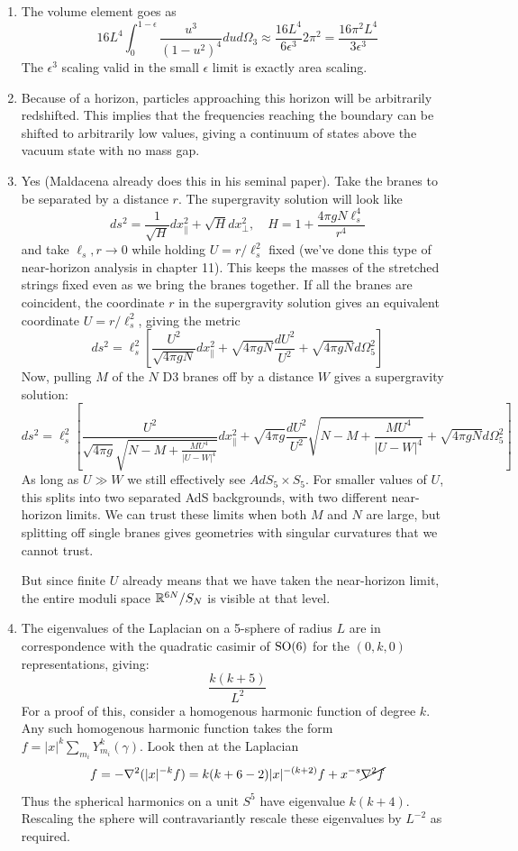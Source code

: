 \documentclass[11pt, class=article, crop=false]{standalone}
\begin{document}
\begin{enumerate}
	\item The volume element goes as
	\[
		16 L^4 \int_0^{1-\epsilon} \frac{u^3}{(1-u^2)^4} du d\Omega_3 \approx \frac{16 L^4}{6 \epsilon^3} 2 \pi^2 = \frac{16 \pi^2 L^4}{3 \epsilon^3}
	\]
	The $\epsilon^3$ scaling valid in the small $\epsilon$ limit is exactly area scaling.
	
	\item Because of a horizon, particles approaching this horizon will be arbitrarily redshifted. This implies that the frequencies reaching the boundary can be shifted to arbitrarily low values, giving a continuum of states above the vacuum state with no mass gap.
	
	\item Yes (Maldacena already does this in his seminal paper). Take the branes to be separated by a distance $r$. The supergravity solution will look like
	\[
		ds^2 = \frac{1}{\sqrt{H}} dx_{\parallel}^2 + \sqrt{H} dx_\perp^2, \quad H = 1 + \frac{4 \pi g N \ell_s^4}{r^4}
	\]
	and take $\ell_s, r \to 0$ while holding $U = r/\ell_s^2$ fixed (we've done this type of near-horizon analysis in chapter 11). This keeps the masses of the stretched strings fixed even as we bring the branes together. If all the branes are coincident, the coordinate $r$ in the supergravity solution gives an equivalent coordinate $U = r/\ell_s^2$, giving the metric
	\[
		ds^2 = \ell_s^2 \left[ \frac{U^2}{\sqrt{4 \pi g N}} dx_\parallel^2 + \sqrt{4 \pi g N} \frac{dU^2}{U^2} + \sqrt{4 \pi g N} d\Omega_5^2 \right]
	\]
	Now, pulling $M$ of the $N$ D3 branes off by a distance $W$ gives a supergravity solution:
	\[
			ds^2 = \ell_s^2 \left[ \frac{U^2}{\sqrt{4 \pi g} \sqrt{N - M + \frac{M U^4}{|U - W|^4}}} dx_\parallel^2 + \sqrt{4 \pi g} \frac{dU^2}{U^2} \sqrt{N - M + \frac{M U^4}{|U - W|^4}} + \sqrt{4 \pi g N} d\Omega_5^2 \right]
	\]
	As long as $U \gg W$ we still effectively see $AdS_5 \times S_5$. For smaller values of $U$, this splits into two separated AdS backgrounds, with two different near-horizon limits. We can trust these limits when both $M$ and $N$ are large, but splitting off single branes gives geometries with singular curvatures that we cannot trust. 
	
	But since finite $U$ already means that we have taken the near-horizon limit, the entire moduli space $\mathbb{R}^{6N}/S_N$ is visible at that level.
	
	\item The eigenvalues of the Laplacian on a 5-sphere of radius $L$ are in correspondence with the quadratic casimir of $\mathrm{SO}(6)$ for the $(0, k, 0)$ representations, giving:
	\[
		\frac{k(k+5)}{L^2}
	\]
	For a proof of this, consider a homogenous harmonic function of degree $k$. Any such homogenous harmonic function takes the form $f = |x|^{k} \sum_{m_i} Y^k_{m_i}(\gamma)$. Look then at the Laplacian
	\[
		f = -\nabla^2 (|x|^{-k} f) = k (k + 6 - 2) |x|^{-(k+2)} f + x^{-s} \cancel{\nabla^2 f}
	\]
	Thus the spherical harmonics on a unit $S^5$ have eigenvalue $k(k+4)$. Rescaling the sphere will contravariantly rescale these eigenvalues by $L^{-2}$ as required.
	

\end{enumerate}
\end{document}
